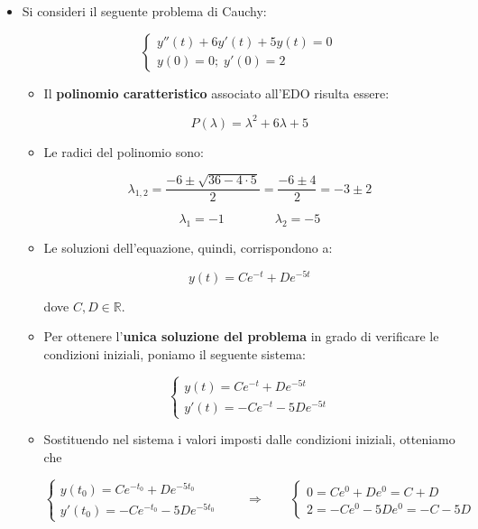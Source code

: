 \documentclass[a4paper, 12pt]{report}
\begin{document}
    \begin{itemize}
        \label{edolno_1}
        \item Si consideri il seguente problema di Cauchy:
        
        \[\left \{ \begin{array}{l}
            y''(t)+6y'(t)+5y(t)=0\\
            y(0)=0; \; y'(0)=2
        \end{array} \right .\]
        
        \begin{itemize}
            \item Il \textbf{polinomio caratteristico} associato all'EDO risulta essere:
            
            \[ P(\lambda) = \lambda^2+6\lambda+5\]
            
            \item Le radici del polinomio sono:
            
            \[ \lambda_{1,2} = \frac{-6 \pm  \sqrt{36-4 \cdot 5}}{2} = \frac{-6 \pm 4}{2} = -3 \pm 2\]
            
            \[ \lambda_1 = -1 \qquad\qquad \lambda_2 = -5\]
            
            \item Le soluzioni dell'equazione, quindi, corrispondono a:
            
            \[ y(t) = Ce^{-t} + De^{-5t}\]
            
            dove $C, D \in \mathbb{R}$.
            
            \item Per ottenere l'\textbf{unica soluzione del problema} in grado di verificare le condizioni iniziali, poniamo il seguente sistema:
            
            $$ 
            \left \{ \begin{array}{l}
                y(t) = Ce^{-t} + De^{-5t} \\
                y'(t) = -Ce^{-t} -5De^{-5t}
            \end{array}\right .
            $$
            
            \item Sostituendo nel sistema i valori imposti dalle condizioni iniziali, otteniamo che
            
            $$ 
            \left \{ \begin{array}{l}
                y(t_0) = Ce^{-t_0} + De^{-5t_0} \\
                y'(t_0) = -Ce^{-t_0} -5De^{-5t_0}
            \end{array}\right .
            \qquad \Longrightarrow \qquad
            \left \{ \begin{array}{l}
                0 = Ce^{0} + De^{0} = C+D \\
                2 = -Ce^{0} -5De^{0} = -C-5D
            \end{array}\right .
            $$
            

\end{itemize}
\end{itemize}
\end{document}
